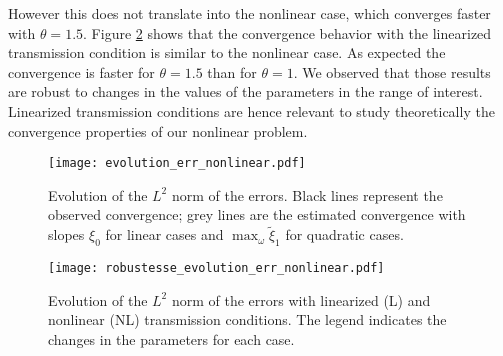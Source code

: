 However this does not translate into the nonlinear case, which converges faster with $\theta=1.5$.
Figure \ref{fig:robustesseEvolutionErrNonlinear}
shows that the convergence behavior with the linearized transmission condition is
similar to the nonlinear case.
As expected the convergence is faster for $\theta=1.5$
than for $\theta=1$.
We observed that those results are robust to changes in the values of the parameters in the range of interest.
Linearized transmission conditions are hence relevant to study
theoretically the
convergence properties of our nonlinear problem.
\begin{figure}
    \centering
    \texttt{[image: evolution\_err\_nonlinear.pdf]}
    \caption{Evolution of the  $L^2$ norm of the errors. Black lines represent the observed convergence; grey lines are the estimated convergence with slopes $\xi_0$ for linear cases and $\max_\omega \widetilde{\xi}_1$ for quadratic cases.}
    \label{fig:evolutionErrNonlinear}
\end{figure}
\begin{figure}
    \centering
    \texttt{[image: robustesse\_evolution\_err\_nonlinear.pdf]}
    \caption{Evolution of the  $L^2$ norm of the errors with linearized (L) and nonlinear (NL) transmission conditions. The legend indicates the changes in the parameters for each case. }
    \label{fig:robustesseEvolutionErrNonlinear}
\end{figure}
%
